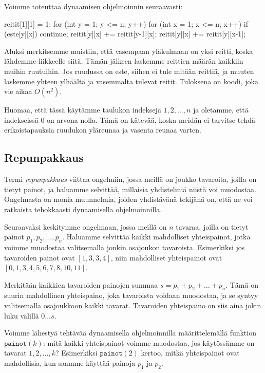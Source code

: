 Voimme toteuttaa dynaamisen ohjelmoinnin seuraavasti:

\begin{code}
reitit[1][1] = 1;
for (int y = 1; y <= n; y++) {
    for (int x = 1; x <= n; x++) {
        if (este[y][x]) continue;
        reitit[y][x] += reitit[y-1][x];
        reitit[y][x] += reitit[y][x-1];
    }
}
\end{code}

Aluksi merkitsemme muistiin, että vasempaan yläkulmaan on yksi reitti,
koska lähdemme liikkeelle siitä.
Tämän jälkeen laskemme reittien määrän kaikkiin muihin ruutuihin.
Jos ruudussa on este, siihen ei tule mitään reittiä,
ja muuten laskemme yhteen ylhäältä ja vasemmalta tulevat reitit.
Tuloksena on koodi, joka vie aikaa $O(n^2)$.

Huomaa, että tässä käytämme taulukon indeksejä $1,2,\dots,n$
ja oletamme, että indekseissä $0$ on arvona nolla.
Tämä on kätevää, koska meidän ei tarvitse tehdä erikoistapauksia
ruudukon yläreunaa ja vasenta reunaa varten.

\subsection{Repunpakkaus}

Termi \emph{repunpakkaus} viittaa ongelmiin, jossa meillä on joukko
tavaroita, joilla on tietyt painot, 
ja haluamme selvittää, millaisia yhdistelmiä niistä voi muodostaa.
Ongelmasta on monia muunnelmia, joiden yhdistävänä tekijänä on,
että ne voi ratkaista tehokkaasti dynaamisella ohjelmoinnilla.

Seuraavaksi keskitymme ongelmaan, jossa meillä on $n$ tavaraa,
joilla on tietyt painot $p_1,p_2,\dots,p_n$.
Haluamme selvittää kaikki mahdolliset yhteispainot,
jotka voimme muodostaa valitsemalla jonkin osajoukon tavaroista.
Esimerkiksi jos tavaroiden painot ovat $[1,3,3,4]$,
niin mahdolliset yhteispainot ovat $[0,1,3,4,5,6,7,8,10,11]$.

Merkitään kaikkien tavaroiden painojen summaa $s=p_1+p_2+\dots+p_n$.
Tämä on suurin mahdollinen yhteispaino, joka tavaroista voidaan
muodostaa, ja se syntyy valitsemalla osajoukkoon kaikki tavarat.
Tavaroiden yhteispaino on siis aina jokin luku välillä $0 \dots s$.

Voimme lähestyä tehtävää dynaamisella ohjelmoinnilla määrittelemällä
funktion $\texttt{painot}(k)$: mitä kaikki yhteispainot voimme
muodostaa, jos käytös\-sämme on tavarat $1,2,\dots,k$?
Esimerkiksi $\texttt{painot}(2)$ kertoo, mitkä yhteispainot ovat
mahdollisia, kun saamme käyttää painoja $p_1$ ja $p_2$.

